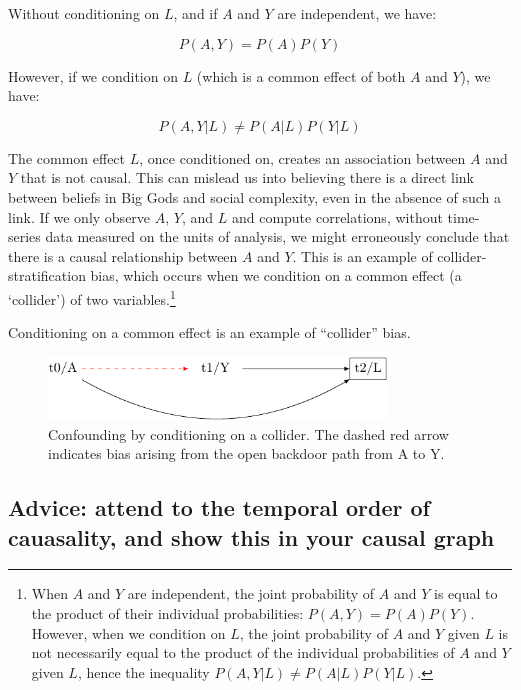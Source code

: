 \documentclass[
  singlecolumn]{report}
\begin{document}
Without conditioning on \(L\), and if \(A\) and \(Y\) are independent,
we have:

\[P(A, Y) = P(A)P(Y)\]

However, if we condition on \(L\) (which is a common effect of both
\(A\) and \(Y\)), we have:

\[P(A, Y | L) \neq P(A | L)P(Y | L)\]

The common effect \(L\), once conditioned on, creates an association
between \(A\) and \(Y\) that is not causal. This can mislead us into
believing there is a direct link between beliefs in Big Gods and social
complexity, even in the absence of such a link. If we only observe
\(A\), \(Y\), and \(L\) and compute correlations, without time-series
data measured on the units of analysis, we might erroneously conclude
that there is a causal relationship between \(A\) and \(Y\). This is an
example of collider-stratification bias, which occurs when we condition
on a common effect (a `collider') of two variables.\footnote{When \(A\)
  and \(Y\) are independent, the joint probability of \(A\) and \(Y\) is
  equal to the product of their individual probabilities:
  \(P(A, Y) = P(A)P(Y)\). However, when we condition on \(L\), the joint
  probability of \(A\) and \(Y\) given \(L\) is not necessarily equal to
  the product of the individual probabilities of \(A\) and \(Y\) given
  \(L\), hence the inequality \(P(A, Y | L) \neq P(A | L)P(Y | L)\).}

Conditioning on a common effect is an example of ``collider'' bias.

\begin{figure}

{\centering \includegraphics[width=0.8\textwidth,height=\textheight]{causal-dags_files/figure-pdf/fig-dag-common-effect-1.pdf}

}

\caption{\label{fig-dag-common-effect}Confounding by conditioning on a
collider. The dashed red arrow indicates bias arising from the open
backdoor path from A to Y.}

\end{figure}

\hypertarget{advice-attend-to-the-temporal-order-of-cauasality-and-show-this-in-your-causal-graph}{%
\subsection{Advice: attend to the temporal order of cauasality, and show
this in your causal
graph}\label{advice-attend-to-the-temporal-order-of-cauasality-and-show-this-in-your-causal-graph}}
\end{document}

